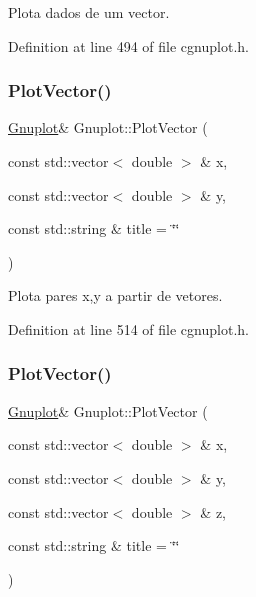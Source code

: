 Plota dados de um vector. 



Definition at line 494 of file cgnuplot.\+h.

\mbox{\label{class_gnuplot_ae282636936128008b2c82f569f607820}} 
\subsubsection{\texorpdfstring{Plot\+Vector()}{PlotVector()}\hspace{0.1cm}{\footnotesize\ttfamily [2/3]}}
{\footnotesize\ttfamily \hyperlink{class_gnuplot}{Gnuplot}\& Gnuplot\+::\+Plot\+Vector (\begin{DoxyParamCaption}\item[{const std\+::vector$<$ double $>$ \&}]{x,  }\item[{const std\+::vector$<$ double $>$ \&}]{y,  }\item[{const std\+::string \&}]{title = {\ttfamily \char`\"{}\char`\"{}} }\end{DoxyParamCaption})\hspace{0.3cm}{\ttfamily [inline]}}



Plota pares x,y a partir de vetores. 



Definition at line 514 of file cgnuplot.\+h.

\mbox{\label{class_gnuplot_a239b222cd7ff6ba4a60d583b22248a4f}} 
\subsubsection{\texorpdfstring{Plot\+Vector()}{PlotVector()}\hspace{0.1cm}{\footnotesize\ttfamily [3/3]}}
{\footnotesize\ttfamily \hyperlink{class_gnuplot}{Gnuplot}\& Gnuplot\+::\+Plot\+Vector (\begin{DoxyParamCaption}\item[{const std\+::vector$<$ double $>$ \&}]{x,  }\item[{const std\+::vector$<$ double $>$ \&}]{y,  }\item[{const std\+::vector$<$ double $>$ \&}]{z,  }\item[{const std\+::string \&}]{title = {\ttfamily \char`\"{}\char`\"{}} }\end{DoxyParamCaption})\hspace{0.3cm}{\ttfamily [inline]}}



